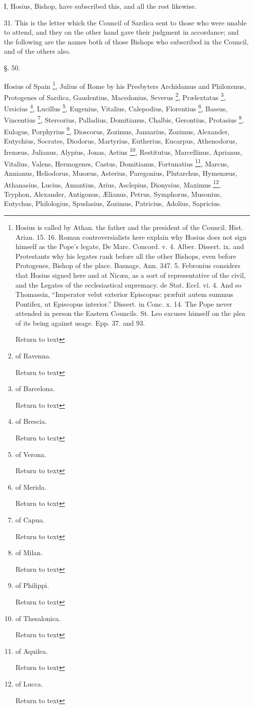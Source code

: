 I, Hosius, Bishop, have subscribed this, and all
the rest likewise.

31. This is the letter which the Council of
Sardica sent to those who were unable to attend, and they on the other
hand gave their judgment in accordance; and the following are the
names both of those Bishops who subscribed in the Council, and of the
others also.

§. 50.

Hosius of Spain \footnote{Hosius is called by Athan. the father and the
president of the Council. Hist. Arian. 15. 16. Roman controversialists
here explain why Hosius does not sign himself as the Pope's legate, De
Marc. Concord. v. 4. Alber. Dissert. ix. and Protestants why his
legates rank before all the other Bishops, even before Protogenes,
Bishop of the place. Basnage, Ann. 347. 5. Febronius considers that
Hosius signed here and at Nicæa, as a sort of representative of the
civil, and the Legates of the ecclesiastical supremacy. de Stat. Eccl.
vi. 4. And so Thomassin, ``Imperator velut exterior Episcopus: præfuit
autem summus Pontifex, ut Episcopus interior.'' Dissert. in Conc. x.
14. The Pope never attended in person the Eastern Councils. St. Leo
excuses himself on the plea of its being against usage. Epp. 37. and
93.

Return to text}, Julius of Rome by his
Presbyters Archidamus and Philoxenus, Protogenes of Sardica,
Gaudentius, Macedonius, Severus \footnote{of Ravenna.

Return to text}, Prælextatus \footnote{of Barcelona.

Return to text},
Ursicius \footnote{of
Brescia.

Return to text}, Lucillus \footnote{of Verona.

Return to text}, Eugenius, Vitalius, Calepodius,
Florentius \footnote{of
Merida.

Return to text}, Bassus, Vincentius
\footnote{of
Capua.

Return to text}, Stercorius,
Palladius, Domitianus, Chalbis, Gerontius, Protasius \footnote{of Milan.

Return to text},
Eulogus, Porphyrius \footnote{of Philippi.

Return to text}, Dioscorus, Zozimus, Januarius, Zozimus,
Alexander, Eutychius, Socrates, Diodorus, Martyrius, Eutherius,
Eucarpus, Athenodorus, Irenæus, Julianus, Alypius, Jonas, Aetius \footnote{of
Thesalonica.

Return to text}, Restitutus, Marcellinus, Aprianus, Vitalius, Valens,
Hermogenes, Castus, Domitianus, Fortunatius \footnote{of
Aquilea.

Return to text}, Marcus,
Annianus, Heliodorus, Musæus, Asterius, Paregonius, Plutarchus,
Hymenæus, Athanasius, Lucius, Amantius, Arius, Asclepius, Dionysius,
Maximus \footnote{of
Lucca.

Return to text}, Tryphon, Alexander, Antigonus, Ælianus, Petrus,
Symphorus, Musonius, Eutychus, Philologius, Spudasius, Zozimus,
Patricius, Adolius, Sapricius.


